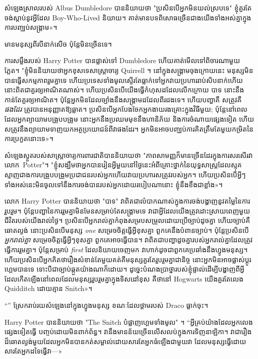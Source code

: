 {{សំឡេងស្រាលរបស់ Albus Dumbledore បាននិយាយថា "ប្រសិនបើអ្នកមិនយល់ស្របទេ" ខ្ញុំគួរតែចង់ស្តាប់នូវអ្វីដែល Boy-Who-Lived និយាយ។ គាត់​មាន​បទ​ពិសោធ​ច្រើន​ជាង​យើង​ទាំង​អស់​គ្នា​ក្នុង​ការ​បញ្ឈប់​សង្គ្រាម»។

មានមនុស្សពីរបីនាក់សើច ប៉ុន្តែមិនច្រើនទេ។

ការសម្លឹងរបស់ Harry Potter បានផ្លាស់ទៅ Dumbledore ហើយគាត់មើលទៅពិចារណាមួយភ្លែត។ "ខ្ញុំមិននិយាយថាអ្នកខុសទេសាស្រ្តាចារ្យ Quirrell ។ នៅក្នុងសង្រ្គាមចុងក្រោយនេះ មនុស្សមិនបានធ្វើសកម្មភាពរួមគ្នាទេ ហើយប្រទេសទាំងមូលស្ទើរតែធ្លាក់ទៅអ្នកវាយប្រហាររាប់សិបនាក់ហើយ នោះពិតជាគួរឲ្យអាណិតណាស់។ ហើយ​ប្រសិនបើ​យើង​ធ្វើ​កំហុស​ដដែល​លើក​ក្រោយ បាទ នោះ​នឹង​កាន់តែ​គួរ​ឲ្យ​អាណិត។ ប៉ុន្តែ​អ្នក​មិន​ដែល​ច្បាំង​នឹង​សង្រ្គាម​ដដែល​ពីរដង​ទេ។ ហើយបញ្ហាគឺ សត្រូវគឺ\emph{ផងដែរ} ត្រូវបានអនុញ្ញាតឱ្យឆ្លាត។ ប្រសិនបើអ្នកបែងចែកអ្នកងាយរងគ្រោះក្នុងវិធីមួយ; ប៉ុន្តែនៅពេលដែលអ្នកព្យាយាមបង្រួបបង្រួម នោះអ្នកនឹងប្រឈមមុខនឹងហានិភ័យ និងការចំណាយផ្សេងទៀត ហើយសត្រូវនឹងព្យាយាមទាញយកអត្ថប្រយោជន៍ពីវាផងដែរ។ អ្នក​មិន​អាច​បញ្ឈប់​ការ​គិត​ត្រឹម​តែ​មួយ​កម្រិត​នៃ​ការ​ប្រកួត​នោះ​ទេ»។

សំឡេងស្ងួតរបស់សាស្រ្តាចារ្យការពារជាតិបាននិយាយថា "ភាពសាមញ្ញក៏មានច្រើនដែរក្នុងការសរសើរវា លោក~Potter"។ "ខ្ញុំសង្ឃឹមថាអ្នកបានរៀនអ្វីមួយនៅថ្ងៃនេះអំពីគ្រោះថ្នាក់នៃយុទ្ធសាស្រ្តដែលស្មុគស្មាញជាងការបង្រួបបង្រួមប្រជាជនរបស់អ្នកហើយវាយប្រហារសត្រូវរបស់អ្នក។ ហើយ​ប្រសិន​បើ​អ្វីៗ​ទាំង​អស់​នេះ​មិន​ចូល​ទៅ​នឹង​ការ​ចង់​បាន​របស់​អ្នក​ដោយ​របៀប​ណា​នោះ ខ្ញុំ​នឹង​ខឹង​ជា​ខ្លាំង»។

លោក Harry Potter បាននិយាយថា "បាទ" វាពិតជាលំបាកណាស់ក្នុងការចង់បង្ហាញនូវតម្លៃនៃការរួបរួម។ ប៉ុន្តែ​បញ្ហា​នៃ​ការ​រួម​គ្នា​មិន​មែន​សម្រាប់​តែ​សង្គ្រាម​ទេ វា​ជា​អ្វី​ដែល​យើង​ត្រូវ​ដោះស្រាយ​ពេញ​មួយ​ជីវិត​របស់​យើង​រាល់​ថ្ងៃ។ ប្រសិនបើ​អ្នក​រាល់គ្នា​កំពុង​សម្រប​សម្រួល​ដោយ​ប្រើ​ច្បាប់​ដូចគ្នា ហើយ​ច្បាប់​គឺ​ឆោតល្ងង់ នោះ​ប្រសិនបើ​មនុស្ស \emph{one} សម្រេច​ចិត្ត​ធ្វើ​អ្វី​ខុស​គ្នា ពួកគេ​នឹង​បំពាន​ច្បាប់។ ប៉ុន្តែប្រសិនបើ \emph{អ្នករាល់គ្នា} សម្រេចចិត្តធ្វើអ្វីៗខុសគ្នា ពួកគេអាចធ្វើបាន។ វា​ពិត​ជា​បញ្ហា​ដូចគ្នា​របស់​អ្នក​រាល់​គ្នា​ដែល​ត្រូវ​ធ្វើ​ការ​រួម​គ្នា។ ប៉ុន្តែសម្រាប់ \emph{first} ដែលនិយាយចេញមក វាហាក់ដូចជាពួកគេប្រឆាំងនឹងហ្វូងមនុស្ស។ ហើយប្រសិនបើអ្នកគិតថារឿងសំខាន់តែមួយគត់គឺមនុស្សគួរតែរួបរួមគ្នាជានិច្ច នោះអ្នកមិនអាចផ្លាស់ប្តូរហ្គេមបានទេ ទោះបីជាច្បាប់ឆ្កួតយ៉ាងណាក៏ដោយ។ ដូច្នេះ​បំណង​ប្រាថ្នា​របស់​ខ្ញុំ​ផ្ទាល់​ដើម្បី​បង្ហាញ​ពី​អ្វី​ដែល​កើត​ឡើង​នៅ​ពេល​ដែល​មនុស្ស​រួបរួម​គ្នា​ក្នុង​ទិសដៅ​ខុស គឺ​ថា​នៅ Hogwarts យើង​គួរ​តែ​លេង Quidditch ដោយ​គ្មាន Snitch»។

“” ស្រែករាប់រយសំឡេងនៅក្នុងហ្វូងមនុស្ស ខណៈដែលថ្គាមរបស់ Draco ធ្លាក់ចុះ។

Harry Potter បាននិយាយថា "The Snitch បំផ្លាញហ្គេមទាំងមូល" ។ “អ្វីគ្រប់យ៉ាងដែលអ្នកលេងផ្សេងទៀតធ្វើ បញ្ចប់ដោយមិនពាក់ព័ន្ធ។ វា​នឹង​មាន​ន័យ​ច្រើន​លើសលប់​ក្នុង​ការ​ទិញ​នាឡិកា។ វា​ជា​រឿង​ដ៏​ឆោត​ល្ងង់​មួយ​ដែល​អ្នក​មិន​បាន​កត់​សម្គាល់​ដោយ​សារ​តែ​អ្នក​ធំ​ឡើង​ជាមួយ​វា ដែល​មនុស្ស​ធ្វើ​ដោយ​សារ​តែ​អ្នក​ដទៃ​ធ្វើ​វា—»

}}
